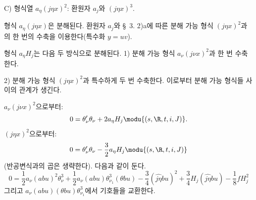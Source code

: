 
\noindent C) 형식열 $a_\eta(j\eta x)^2$: 환원자 $a_j$와 $(j\eta x)^3$.

형식 $a_\eta(j\eta x)$은 분해된다. 환원자 $a_j$와 \S\ 3. 2)a에 따른 분해 가능 형식 $(j\eta x)^2$과의 한 번의 수축을 이용한다(특수화 $y=uv$).

형식 $a_\eta H_j$는 다음 두 방식으로 분해된다. 1) 분해 가능 형식 $a_\nu(j\nu x)^2$과 한 번 수축한다.

2) 분해 가능 형식 $(j\eta x)^2$과 특수하게 두 번 수축한다. 이로부터 분해 가능 형식들 사이의 관계가 생긴다.

$a_\nu(j\nu x)^2$으로부터:
\[
0=\theta_\nu'\theta_\nu+2a_\eta H_j\modu{(s,\R,t,i,J)}.
\]
$(j\eta x)^2$으로부터:
\[
0=\theta_\nu'\theta_\nu-\frac32a_\eta H_j\modu{(s,\R,t,i,J)}
\]
(반공변식과의 곱은 생략한다). 다음과 같이 둔다.
\[
0=\frac12a_\nu(abu)^2\theta_\nu^3
+\frac12a_\nu(abu)\theta_{\nu_1}^3(\theta bu)
-\frac34(\widehat{j\eta}bu)^2+\frac34H_j(\widehat{j\eta}bu)
-\frac18fH_j^2
\]
그리고 $a_\nu(abu)(\theta bu)\theta_{\nu_1}^3$에서 기호들을 교환한다.

